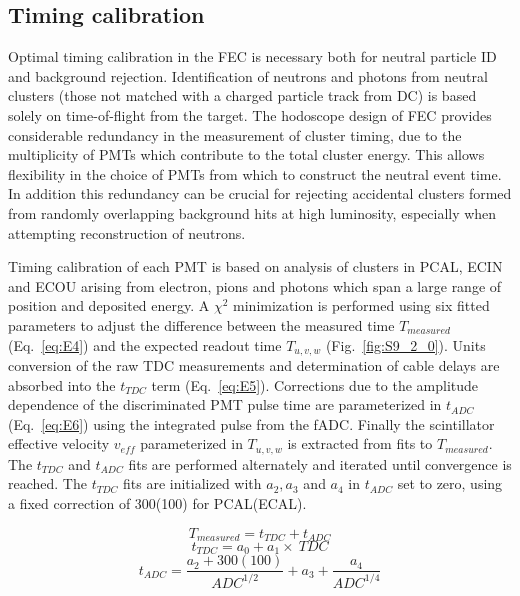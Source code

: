 \subsection{Timing calibration}

Optimal timing calibration in the FEC is necessary both for neutral particle ID and background rejection.  Identification of neutrons and photons from neutral clusters (those not matched with a charged particle track from DC) is based solely on time-of-flight from the target.  The hodoscope design of FEC provides considerable redundancy in the measurement of cluster timing, due to the multiplicity of PMTs which contribute to the total cluster energy.  This allows flexibility in the choice of PMTs from which to construct the neutral event time.  In addition this redundancy can be crucial for rejecting accidental clusters formed from randomly overlapping background hits at high luminosity, especially when attempting reconstruction of neutrons. 

Timing calibration of each PMT is based on analysis of clusters in PCAL, ECIN and ECOU arising from electron, pions and photons which span a large range of position and deposited energy.   A $\chi^2$ minimization is performed using six fitted parameters to adjust the difference between the measured time $T_{measured}$ (Eq.~\ref{eq:E4}) and the expected readout time $T_{u,v,w}$ (Fig.~\ref{fig:S9_2_0}).  Units conversion of the raw TDC measurements and determination of cable delays are absorbed into the $t_{TDC}$ term (Eq.~\ref{eq:E5}).  Corrections due to the amplitude dependence of the discriminated PMT pulse time are parameterized in $t_{ADC}$ (Eq.~\ref{eq:E6}) using the integrated pulse from the fADC.  Finally the scintillator effective velocity $v_{eff}$ parameterized in $T_{u,v,w}$ is extracted from fits to $T_{measured}$.  The $t_{TDC}$ and $t_{ADC}$ fits are performed alternately and iterated until convergence is reached.  The $t_{TDC}$ fits are initialized with $a_2, a_3$ and $a_4$ in $t_{ADC}$ set to zero, using a fixed correction of 300(100) for PCAL(ECAL).

\begin{equation}
T_{measured}=t_{TDC}+t_{ADC} \label{eq:E4}
\end{equation}
\begin{equation}
t_{TDC}=a_0+a_1\times~TDC \label{eq:E5}
\end{equation}
\begin{equation}
t_{ADC}=\frac{a_2+300(100)}{ADC^{1/2}}+a_3+\frac{a_4}{ADC^{1/4}} \label{eq:E6}
\end{equation}

